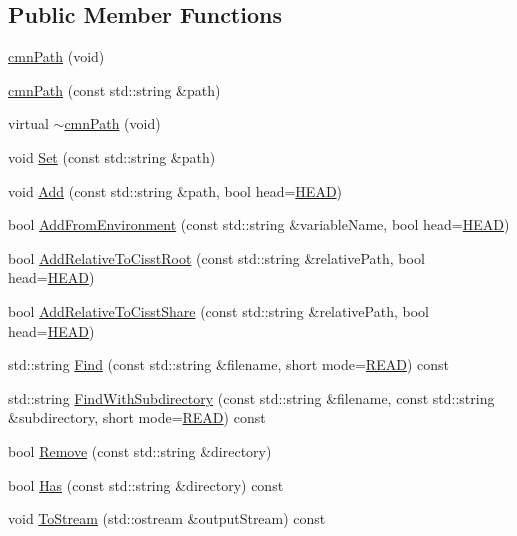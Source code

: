 \subsection*{Public Member Functions}
\begin{DoxyCompactItemize}
\item 
\hyperlink{classcmn_path_ae7372aae252f17f219353fddbbedabf8}{cmn\-Path} (void)
\item 
\hyperlink{classcmn_path_ac59578e065ce38a729b59fa9827619b0}{cmn\-Path} (const std\-::string \&path)
\item 
virtual \hyperlink{classcmn_path_aa518198d8cfca3efe29c53ecc4643fc5}{$\sim$cmn\-Path} (void)
\item 
void \hyperlink{classcmn_path_a322c6bb770d1c4eab76e607d1a1c42cc}{Set} (const std\-::string \&path)
\item 
void \hyperlink{classcmn_path_a9befae06a868615a5df0442298014db6}{Add} (const std\-::string \&path, bool head=\hyperlink{classcmn_path_ac052729bcebb4fcdcef7eaaa81c21ab9a53c54bb785ea4ed82a051ce4508f152a}{H\-E\-A\-D})
\item 
bool \hyperlink{classcmn_path_a98560267f6ffa9994df283b333cad870}{Add\-From\-Environment} (const std\-::string \&variable\-Name, bool head=\hyperlink{classcmn_path_ac052729bcebb4fcdcef7eaaa81c21ab9a53c54bb785ea4ed82a051ce4508f152a}{H\-E\-A\-D})
\item 
bool \hyperlink{classcmn_path_ac698e3725043e5f588cc10bc1e6c32a5}{Add\-Relative\-To\-Cisst\-Root} (const std\-::string \&relative\-Path, bool head=\hyperlink{classcmn_path_ac052729bcebb4fcdcef7eaaa81c21ab9a53c54bb785ea4ed82a051ce4508f152a}{H\-E\-A\-D})
\item 
bool \hyperlink{classcmn_path_a755f7ec7bdae368f1a63bcfbfcfd826e}{Add\-Relative\-To\-Cisst\-Share} (const std\-::string \&relative\-Path, bool head=\hyperlink{classcmn_path_ac052729bcebb4fcdcef7eaaa81c21ab9a53c54bb785ea4ed82a051ce4508f152a}{H\-E\-A\-D})
\item 
std\-::string \hyperlink{classcmn_path_a9a6b0ab7944a7fbb24485f8bf0769f1d}{Find} (const std\-::string \&filename, short mode=\hyperlink{classcmn_path_a15dacf9562d80d5b7eb9b849726e768caea0bb09a4a02da90f6c172531cd17a05}{R\-E\-A\-D}) const 
\item 
std\-::string \hyperlink{classcmn_path_a4f22b53ac0299045f641a4358999bc58}{Find\-With\-Subdirectory} (const std\-::string \&filename, const std\-::string \&subdirectory, short mode=\hyperlink{classcmn_path_a15dacf9562d80d5b7eb9b849726e768caea0bb09a4a02da90f6c172531cd17a05}{R\-E\-A\-D}) const 
\item 
bool \hyperlink{classcmn_path_a9bf81a4e84a5dfb0155931c62b6b202f}{Remove} (const std\-::string \&directory)
\item 
bool \hyperlink{classcmn_path_a53ba5d514e306f66fc46a4faea29a1eb}{Has} (const std\-::string \&directory) const 
\item 
void \hyperlink{classcmn_path_a5e3065cee44575c04db18e8b1e3c8174}{To\-Stream} (std\-::ostream \&output\-Stream) const 
\end{DoxyCompactItemize}
